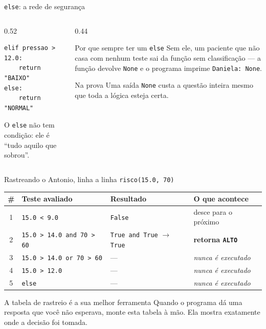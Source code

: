 \documentclass[aspectratio=169]{beamer}
\newcommand{\code}[1]{\texttt{\small #1}}
\begin{document}
\begin{frame}[fragile]{\texttt{else}: a rede de segurança}
  \begin{columns}[T]
    \begin{column}{0.52\textwidth}
\begin{lstlisting}
elif pressao > 12.0:
    return "BAIXO"
else:
    return "NORMAL"
\end{lstlisting}
      \vspace{0.2cm}
      O \code{else} não tem condição: ele é ``tudo aquilo que sobrou''.
    \end{column}
    \begin{column}{0.44\textwidth}
      \begin{block}{Por que sempre ter um \code{else}}
        Sem ele, um paciente que não casa com nenhum teste sai da
        função sem classificação --- a função devolve \code{None}
        e o programa imprime \code{Daniela: None}.
      \end{block}
      \begin{alertblock}{Na prova}
        Uma saída \code{None} custa a questão inteira mesmo que toda
        a lógica esteja certa.
      \end{alertblock}
    \end{column}
  \end{columns}
\end{frame}

\begin{frame}{Rastreando o Antonio, linha a linha}
  \code{risco(15.0, 70)}
  \vspace{0.2cm}
  \begin{center}
  \scriptsize
  \begin{tabular}{@{}clll@{}}
    \toprule
    \textbf{\#} & \textbf{Teste avaliado} & \textbf{Resultado} & \textbf{O que acontece} \\
    \midrule
    1 & \code{15.0 < 9.0} & \code{False} & desce para o próximo \\
    2 & \code{15.0 > 14.0 and 70 > 60} & \code{True and True} $\to$ \code{True}
      & \textbf{retorna \code{ALTO}} \\
    3 & \code{15.0 > 14.0 or 70 > 60} & --- & \emph{nunca é executado} \\
    4 & \code{15.0 > 12.0} & --- & \emph{nunca é executado} \\
    5 & \code{else} & --- & \emph{nunca é executado} \\
    \bottomrule
  \end{tabular}
  \end{center}

  \vspace{0.25cm}
  \begin{exampleblock}{A tabela de rastreio é a sua melhor ferramenta}
    Quando o programa dá uma resposta que você não esperava, monte
    esta tabela à mão. Ela mostra exatamente onde a decisão foi tomada.
  \end{exampleblock}
\end{frame}
\end{document}
